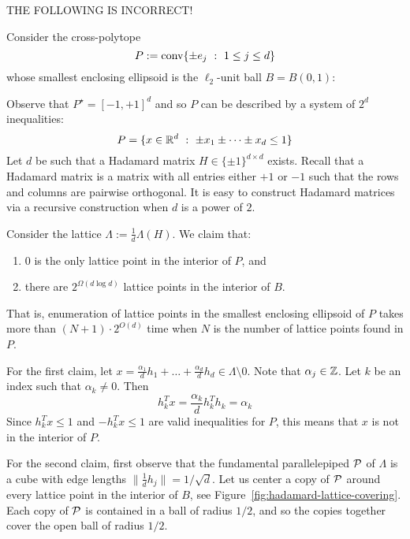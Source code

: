 THE FOLLOWING IS INCORRECT!

Consider the cross-polytope
\[
  P := \operatorname{conv}\{ \pm e_j ~:~ 1 \leq j \leq d \}
\]
whose smallest enclosing ellipsoid is the $\ell_2$-unit ball $B = B(0,1)$:
\begin{center}
\end{center}
Observe that $P^\star = [-1,+1]^d$
and so $P$ can be described by a system of $2^d$ inequalities:
\[
  P = \{ x \in \mathbb{R}^d ~:~ \pm x_1 \pm \dots \pm x_d \leq 1 \}
\]
Let $d$ be such that a Hadamard matrix $H \in \{ \pm 1 \}^{d \times d}$ exists.
Recall that a Hadamard matrix is a matrix with all entries either $+1$ or $-1$
such that the rows and columns are pairwise orthogonal.
It is easy to construct Hadamard matrices via a recursive construction
when $d$ is a power of $2$.

Consider the lattice $\Lambda := \frac{1}{d} \Lambda(H)$.
We claim that:
\begin{enumerate}
  \item $0$ is the only lattice point in the interior of $P$, and
  \item there are $2^{\Omega(d \log d)}$ lattice points in the interior of $B$.
\end{enumerate}
That is, enumeration of lattice points in the smallest enclosing ellipsoid of $P$
takes more than $(N+1)\cdot 2^{O(d)}$ time when $N$ is the number of lattice points found in $P$.

For the first claim,
let $x = \frac{\alpha_1}{d} h_1 + \dots + \frac{\alpha_d}{d} h_d \in \Lambda\setminus 0$.
Note that $\alpha_j \in \mathbb{Z}$.
Let $k$ be an index such that $\alpha_k \neq 0$.
Then
\[
  h_k^T x = \frac{\alpha_k}{d} h_k^T h_k = \alpha_k
\]
Since $h_k^Tx \leq 1$ and $-h_k^Tx \leq 1$ are valid inequalities for $P$,
this means that $x$ is not in the interior of $P$.

For the second claim,
first observe that the fundamental parallelepiped $\mathcal{P}$ of $\Lambda$
is a cube with edge lengths $\|\frac{1}{d} h_j\| = 1/\sqrt{d}$.
Let us center a copy of $\mathcal{P}$ around every lattice point in the interior of $B$,
see Figure~\ref{fig:hadamard-lattice-covering}.
Each copy of $\mathcal{P}$ is contained in a ball of radius $1/2$,
and so the copies together cover the open ball of radius $1/2$.

